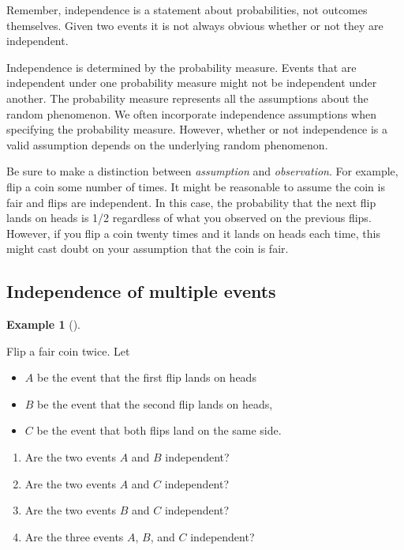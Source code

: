 \documentclass[
  letterpaper,
  DIV=11,
  numbers=noendperiod]{scrreprt}
\providecommand{\tightlist}{%
  \setlength{\itemsep}{0pt}\setlength{\parskip}{0pt}}
\theoremstyle{plain}
\theoremstyle{definition}
\newtheorem{example}{Example}[chapter]
\theoremstyle{definition}
\theoremstyle{definition}
\theoremstyle{remark}
\begin{document}
Remember, independence is a statement about probabilities, not outcomes
themselves. Given two events it is not always obvious whether or not
they are independent.

Independence is determined by the probability measure. Events that are
independent under one probability measure might not be independent under
another. The probability measure represents all the assumptions about
the random phenomenon. We often incorporate independence assumptions
when specifying the probability measure. However, whether or not
independence is a valid assumption depends on the underlying random
phenomenon.

Be sure to make a distinction between \emph{assumption} and
\emph{observation}. For example, flip a coin some number of times. It
might be reasonable to assume the coin is fair and flips are
independent. In this case, the probability that the next flip lands on
heads is 1/2 regardless of what you observed on the previous flips.
However, if you flip a coin twenty times and it lands on heads each
time, this might cast doubt on your assumption that the coin is fair.

\subsection{Independence of multiple
events}\label{independence-of-multiple-events}

\begin{tcolorbox}[enhanced jigsaw, opacityback=0, left=2mm, colframe=quarto-callout-note-color-frame, toprule=.15mm, breakable, colback=white, leftrule=.75mm, arc=.35mm, rightrule=.15mm, bottomrule=.15mm]

\begin{example}[]\protect\hypertarget{exm-coin-multiple-events-independent}{}\label{exm-coin-multiple-events-independent}

Flip a fair coin twice. Let

\begin{itemize}
\tightlist
\item
  \(A\) be the event that the first flip lands on heads
\item
  \(B\) be the event that the second flip lands on heads,
\item
  \(C\) be the event that both flips land on the same side.
\end{itemize}

\begin{enumerate}
\def\labelenumi{\arabic{enumi}.}
\tightlist
\item
  Are the two events \(A\) and \(B\) independent?
\item
  Are the two events \(A\) and \(C\) independent?
\item
  Are the two events \(B\) and \(C\) independent?
\item
  Are the three events \(A\), \(B\), and \(C\) independent?
\end{enumerate}

\end{example}

\end{tcolorbox}
\end{document}
